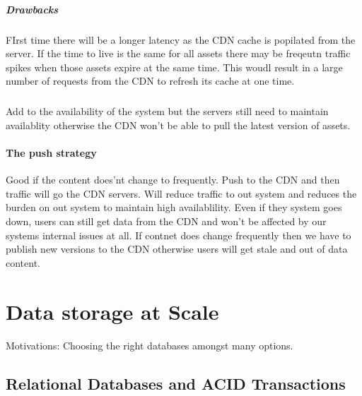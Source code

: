 \documentclass[a4paper, 11pt]{book}
\begin{document}
    \paragraph{Drawbacks}
    FIrst time there will be a longer latency as the CDN cache is popilated from the server.
    If the time to live is the same for all assets there may be freqeutn traffic spikes when those assets expire at the same time.
    This woudl result in a large number of requests from the CDN to refresh its cache at one time.

    \paragraph{}
    Add to the availability of the system but the servers still need to maintain availablity otherwise the CDN won't be able to pull the latest version of assets.

    \subsubsection{The push strategy}
    Good if the content does'nt change to frequently. Push to the CDN and then traffic will go the CDN servers.
    Will reduce traffic to out system and reduces the burden on out system to maintain high availablility.
    Even if they system goes down, users can still get data from the CDN and won't be affected by our systems internal issues at all.
    If contnet does change frequently then we have to publish new versions to the CDN otherwise users will get stale and out of data content.


    \chapter{Data storage at Scale}
    Motivations: Choosing the right databases amongst many options.


    \section{Relational Databases and ACID Transactions}
\end{document}
